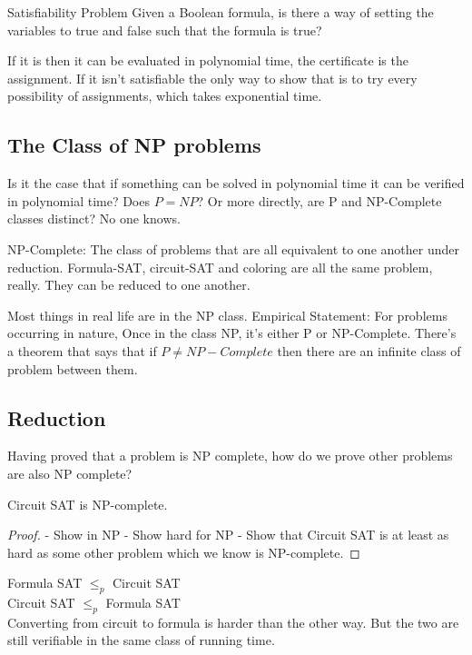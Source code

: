 \documentclass[english, 10pt]{article}
\begin{document}
\begin{defn}[SAT]
Satisfiability Problem Given a Boolean formula, is there a way of setting the variables to true and
false such that the formula is true?
\end{defn}

If it is then it can be evaluated in polynomial time, the certificate is the
assignment. If it isn't satisfiable the only way to show that is to try every
possibility of assignments, which takes exponential time.

\subsection{The Class of NP problems}

Is it the case that if something can be solved in polynomial time it can be verified in polynomial time?
Does $P = NP$? Or more directly, are P and NP-Complete classes distinct?
No one knows.

NP-Complete: The class of problems that are all equivalent to one another under
reduction.  Formula-SAT, circuit-SAT and coloring are all the same problem,
really. They can be reduced to one another.

Most things in real life are in the NP class. Empirical Statement: For problems
occurring in nature, Once in the class NP, it's either P or NP-Complete.
There's a theorem that says that if $P \neq NP-Complete$ then there are an
infinite class of problem between them.

\subsection{Reduction}
Having proved that a problem is NP complete, how do we prove other problems are also NP complete?

\begin{thrm}
    Circuit SAT is NP-complete.
\end{thrm}

\begin{proof}
    - Show in NP
    - Show hard for NP
    - Show that Circuit SAT is at least as hard as some other problem which we know is NP-complete.
\end{proof}

Formula SAT $\le_p$ Circuit SAT \\
Circuit SAT $\le_p$ Formula SAT \\

Converting from circuit to formula is harder than the other way. But the two
are still verifiable in the same class of running time.
\end{document}
